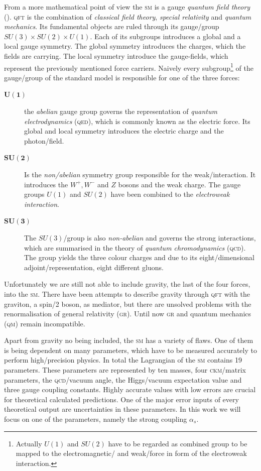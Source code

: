 \documentclass[../../index.tex]{subfiles}
\begin{document}
From a more mathematical point of view the \textsc{sm} is a gauge \textit{
  quantum field theory} (). \textsc{qft}
is the combination of \textit{classical field theory}, \textit{special
  relativity} and \textit{quantum mechanics}. Its fundamental objects are ruled
through its gauge\-/group $SU(3)\times SU(2)\times U(1)$. Each of its subgroups
introduces a global and a local gauge symmetry. The global symmetry introduces
the charges, which the fields are carrying. The local symmetry introduce the
gauge-fields, which represent the previously mentioned force carriers. Naively
every subgroup\footnote{Actually $U(1)$ and $SU(2)$ have to be regarded as
  combined group to be mapped to the electromagnetic\-/ and weak\-/force in form
  of the electroweak interaction.} of the gauge\-/group of the standard model is
responsible for one of the three forces:
\begin{description}
\item[$\bm{U(1)}$] the \textit{abelian} gauge group governs the representation
  of \textit{quantum electrodynamics} (\textsc{qed}), which is commonly known as
  the electric force. Its global and local symmetry introduces the electric
  charge and the photon\-/field.
\item[$\bm{SU(2)}$] Is the \textit{non\-/abelian} symmetry group responsible for
  the weak\-/interaction. It introduces the $W^+,W^-$ and $Z$ bosons and the
  weak charge. The gauge groups $U(1)$ and $SU(2)$ have been combined to the
  \textit{electroweak interaction}.
\item[$\bm{SU(3)}$] The $SU(3)$\-/group is also \textit{non-abelian} and governs
  the strong interactions, which are summarised in the theory of \textit{quantum
    chromodynamics} (\textsc{qcd}).
  The group yields the three colour charges and due to its eight\-/dimensional
  adjoint\-/representation, eight different gluons.
\end{description}
Unfortunately we are still not able to include gravity, the last of the four
forces, into the \textsc{sm}. There have been attempts to describe gravity
through \textsc{qft} with the graviton, a spin\-/2 boson, as mediator, but there
are unsolved problems with the renormalisation of general relativity
(\textsc{gr}). Until now \textsc{gr} and quantum mechanics (\textsc{qm}) remain
incompatible.

Apart from gravity no being included, the \textsc{sm} has a variety of flaws.
One of them is being dependent on many parameters, which have to be measured
accurately to perform high\-/precision physics. In total the Lagrangian of the
\textsc{sm} contains 19 parameters. These parameters are represented by ten
masses, four \textsc{ckm}\-/matrix parameters, the \textsc{qcd}\-/vacuum angle,
the Higgs\-/vacuum expectation value and three gauge coupling constants. Highly
accurate values with low errors are crucial for theoretical calculated
predictions. One of the major error inputs of every theoretical output are
uncertainties in these parameters. In this work we will focus on one of the
parameters, namely the strong coupling $\alpha_s$.
\end{document}
